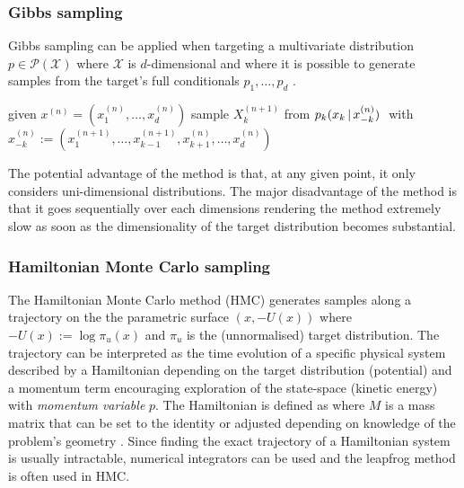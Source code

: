 \subsubsection{Gibbs sampling}

Gibbs sampling can be applied when targeting a multivariate distribution $p\in \mathcal P(\mathcal X)$ where $\mathcal X$ is $d$-dimensional and where it is possible to generate samples from the target's full conditionals $p_{1}, \dots, p_{d}$ \citep[chapter 7]{robert04}.

\begin{algorithm}[!h]\small
	\caption{\label{alg:gibbs-alg}}
	\begin{algorithmic}[1]
		\State given $x^{(n)}=(x_{1}^{(n)},\dots,x_{d}^{(n)})$
			\State sample $X^{(n+1)}_{k} $ from $ p_{k}(x_{k}\,|\, x^{(n)}_{-k})$ \,\,with $x_{-k}^{(n)}:=(x_{1}^{(n+1)},\dots,x_{k-1}^{(n+1)},x_{k+1}^{(n)},\dots,x_{d}^{(n)})$
		\EndFor
	\end{algorithmic}
\end{algorithm}

The potential advantage of the method is that, at any given point, it only considers uni-dimensional distributions. 
The major disadvantage of the method is that it goes sequentially over each dimensions rendering the method extremely slow as soon as the dimensionality of the target distribution becomes substantial.


\subsubsection{Hamiltonian Monte Carlo sampling}

The Hamiltonian Monte Carlo method (HMC) generates samples along a trajectory on the the parametric surface $(x, -U(x))$ where $-U(x):=\log \pi_{u}(x)$ and $\pi_{u}$ is the (unnormalised) target distribution.
The trajectory can be interpreted as the time evolution of a specific physical system described by a Hamiltonian depending on the target distribution (potential) and a momentum term encouraging exploration of the state-space (kinetic energy) with \emph{momentum variable} $p$. The Hamiltonian is defined as
where $M$ is a mass matrix that can be set to the identity or adjusted depending on knowledge of the problem's geometry \citep{betancourt17, barp18}. 
Since finding the exact trajectory of a Hamiltonian system is usually intractable, numerical integrators can be used and the leapfrog method is often used in HMC.

